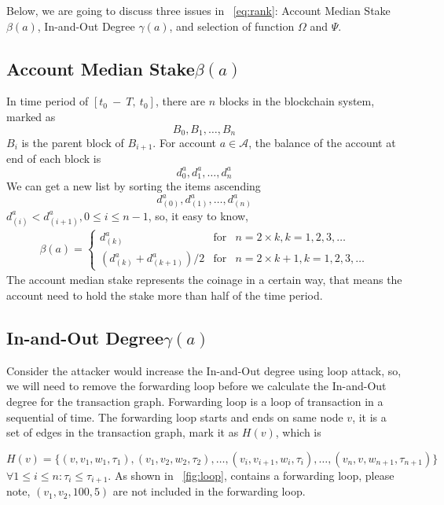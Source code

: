 Below, we are going to discuss three issues in ~\ref{eq:rank}: Account Median Stake $\beta(a)$, In-and-Out Degree $\gamma(a)$, and selection of function $\Omega$ and $\Psi$.

\subsection{Account Median Stake$\beta(a)$}
In time period of $[t_0\ −\ T,\ t_0]$, there are $n$ blocks in the blockchain system, marked as
\[
B_0, B_1, \dots, B_n
\]
\noindent $B_{i}$ is the parent block of $B_{i+1}$. For account $a \in \mathcal{A}$, the balance of the account at end of each block is
\[
d^a_0, d^a_1, \dots, d^a_n
\]
We can get a new list by sorting the items ascending 
\[
d^a_{(0)}, d^a_{(1)}, \dots, d^a_{(n)}
\]
$d^a_{(i)} < d^a_{(i+1)}, 0\le i \le {n-1}$, so, it easy to know,
\begin{align}
\beta(a) = \left\{ \begin{array}{rcl}
{d^a_{(k)}} & \mbox{for} & n=2\times{}k, k=1, 2, 3, \ldots \\
{(d^a_{(k)} + d^a_{(k+1)})/2} & \mbox{for} & n=2\times{}k + 1, k=1, 2, 3, \ldots
\end{array}\right.
\end{align}
The account median stake represents the coinage in a certain way, that means the account need to hold the stake more than half of the time period.

\subsection{In-and-Out Degree$\gamma(a)$}
Consider the attacker would increase the In-and-Out degree using loop attack, so, we will need to remove the forwarding loop before we calculate the In-and-Out degree for the transaction graph. Forwarding loop is a loop of transaction in a sequential of time.
The forwarding loop starts and ends on same node $v$, it is a set of edges in the transaction graph, mark it as $H(v)$, which is

\[
H(v) = \{(v, v_1, w_1, \tau_1), (v_1, v_2, w_2, \tau_2), \dots, (v_i, v_{i+1}, w_{i}, \tau_i), \dots, (v_n, v, w_{n+1}, \tau_{n+1})\}
\]
\noindent $\forall 1\le i \le n : \tau_i \le \tau_{i+1} $.
\noindent As shown in ~\ref{fig:loop}, contains a forwarding loop, please note, $(v_1, v_2, 100, 5)$ are not included in the forwarding loop.




